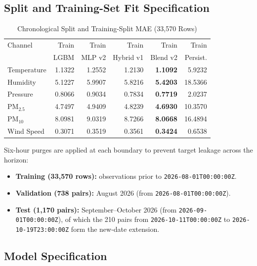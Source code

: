 \documentclass[journal,a4paper]{IEEEtran}
\begin{document}
\subsection{Split and Training-Set Fit Specification}

\begin{table}[!htbp]
\caption{Chronological Split and Training-Split MAE (33{,}570 Rows)}
\label{tab:split}
\centering
\footnotesize
\setlength{\tabcolsep}{3.5pt}
\begin{tabular}{@{}lrrrrr@{}}
\toprule
Channel & Train & Train & Train & Train & Train \\
        & LGBM & MLP v2 & Hybrid v1 & Blend v2 & Persist. \\
\midrule
Temperature & 1.1322 & 1.2552 & 1.2130 & \textbf{1.1092} & 5.9232 \\
Humidity    & 5.1227 & 5.9907 & 5.8216 & \textbf{5.4203} & 18.5366 \\
Pressure    & 0.8066 & 0.9034 & 0.7834 & \textbf{0.7719} & 2.0237 \\
PM$_{2.5}$  & 4.7497 & 4.9409 & 4.8239 & \textbf{4.6930} & 10.3570 \\
PM$_{10}$   & 8.0981 & 9.0319 & 8.7266 & \textbf{8.0668} & 16.4894 \\
Wind Speed  & 0.3071 & 0.3519 & 0.3561 & \textbf{0.3424} & 0.6538 \\
\bottomrule
\end{tabular}
\end{table}

Six-hour purges are applied at each boundary to prevent target leakage across the horizon:
\begin{itemize}
  \item \textbf{Training (33{,}570 rows):} observations prior to \texttt{2026-08-01T00:00:00Z}.
  \item \textbf{Validation (738 pairs):} August 2026 (from \texttt{2026-08-01T00:00:00Z}).
  \item \textbf{Test (1{,}170 pairs):} September--October 2026 (from \texttt{2026-09-01T00:00:00Z}), of which the 210 pairs from \texttt{2026-10-11T00:00:00Z} to \texttt{2026-10-19T23:00:00Z} form the new-date extension.
\end{itemize}

\subsection{Model Specification}
\end{document}
